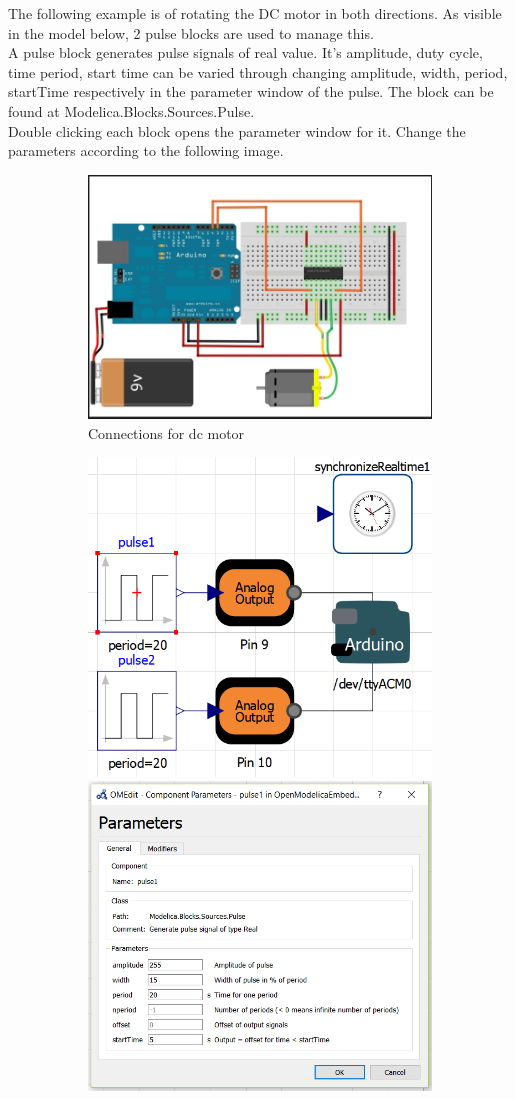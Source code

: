 \documentclass[12pt,a4paper]{report}
\begin{document}
The following example is of rotating the DC motor in both directions. As visible in the model below, 2 pulse blocks are used to manage this. \\

A pulse block generates pulse signals of real value. It’s amplitude, duty cycle, time period, start time can be varied through changing amplitude, width, period, startTime respectively in the parameter window of the pulse. The block can be found at Modelica.Blocks.Sources.Pulse.\\

Double clicking each block opens the parameter window for it. Change the parameters according to the following image.

\begin{figure}[H]
\begin{subfigure}{.75\textwidth}
\centering
\includegraphics[width =\linewidth]{4}
\caption{Connections for dc motor}
\end{subfigure}
\begin{subfigure}{\textwidth}
\centering
\includegraphics[width =0.3\linewidth]{dc_ex2}
\includegraphics[width =0.3\linewidth]{dc_ex2_2}

\end{subfigure}
\end{figure}
\end{document}
